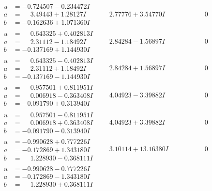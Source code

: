 \documentclass[1p]{elsarticle_modified}
\theoremstyle{definition}
\begin{document}
$$\begin{array}{c|c|c}
\begin{aligned}
u &= -0.724507 - 0.234472 I \\
a &= \phantom{-}3.49443 + 1.28127 I \\
b &= -0.162636 + 1.071360 I\end{aligned}
 & \phantom{-}2.77776 + 3.54770 I & \phantom{-0.000000 } 0 \\ \hline\begin{aligned}
u &= \phantom{-}0.643325 + 0.402813 I \\
a &= \phantom{-}2.31112 - 1.18492 I \\
b &= -0.137169 + 1.144930 I\end{aligned}
 & \phantom{-}2.84284 - 1.56897 I & \phantom{-0.000000 } 0 \\ \hline\begin{aligned}
u &= \phantom{-}0.643325 - 0.402813 I \\
a &= \phantom{-}2.31112 + 1.18492 I \\
b &= -0.137169 - 1.144930 I\end{aligned}
 & \phantom{-}2.84284 + 1.56897 I & \phantom{-0.000000 } 0 \\ \hline\begin{aligned}
u &= \phantom{-}0.957501 + 0.811951 I \\
a &= \phantom{-}0.006918 - 0.363408 I \\
b &= -0.091790 + 0.313940 I\end{aligned}
 & \phantom{-}4.04923 - 3.39882 I & \phantom{-0.000000 } 0 \\ \hline\begin{aligned}
u &= \phantom{-}0.957501 - 0.811951 I \\
a &= \phantom{-}0.006918 + 0.363408 I \\
b &= -0.091790 - 0.313940 I\end{aligned}
 & \phantom{-}4.04923 + 3.39882 I & \phantom{-0.000000 } 0 \\ \hline\begin{aligned}
u &= -0.990628 + 0.777226 I \\
a &= -0.172869 + 1.343180 I \\
b &= \phantom{-}1.228930 - 0.368111 I\end{aligned}
 & \phantom{-}3.10114 + 13.16380 I & \phantom{-0.000000 } 0 \\ \hline\begin{aligned}
u &= -0.990628 - 0.777226 I \\
a &= -0.172869 - 1.343180 I \\
b &= \phantom{-}1.228930 + 0.368111 I\end{aligned}

\end{array}$$
\end{document}
